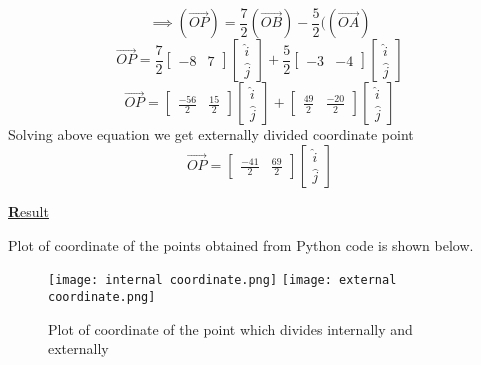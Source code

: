\documentclass[journal,12pt,twocolumn]{IEEEtran}
\begin{document}
\begin{equation}
\implies (\overrightarrow{OP})=
\frac{7}{2}
(\overrightarrow{OB})-\frac{5}{2}((\overrightarrow{OA})
\end{equation}
\begin{equation}
\overrightarrow{OP}=
\frac{7}{2}
 \begin{bmatrix}
 -8 & 7 
 \end{bmatrix}
 \begin{bmatrix}
 \hat{i}\\
 \hat{j}
 \end{bmatrix}
+\frac{5}{2}
\begin{bmatrix}
-3 & -4
\end{bmatrix}
 \begin{bmatrix}
\hat{i}\\
\hat{j}
 \end{bmatrix}
\end{equation}
\begin{equation}
\overrightarrow{OP}=
\begin{bmatrix}
\frac{-56}{2} & \frac{15}{2} 
 \end{bmatrix}
 \begin{bmatrix}
 \hat{i}\\
 \hat{j}
 \end{bmatrix}
+
 \begin{bmatrix}
\frac{49}{2} & \frac{-20}{2} 
 \end{bmatrix}
 \begin{bmatrix}
 \hat{i}\\
 \hat{j}
 \end{bmatrix}
\end{equation}
 Solving above equation we get externally divided coordinate point
\begin{equation}
 \overrightarrow{OP}=
\begin{bmatrix}
\frac{-41}{2}  &  \frac{69}{2}
\end{bmatrix}
 \begin{bmatrix}
 \hat{i}\\
 \hat{j}
 \end{bmatrix}
\end{equation}
\newpage

\maketitle
\begin{center}
{\underline{\Large\textbf Result}}  
\end{center}
Plot of coordinate of the points obtained from Python code is shown below.
\\
\begin{figure}[!ht]

\texttt{[image: internal coordinate.png]}
\texttt{[image: external coordinate.png]}
\caption{ Plot of coordinate of the point which divides internally and externally }
\label{fig}
\end{figure}
  
\end{document}
